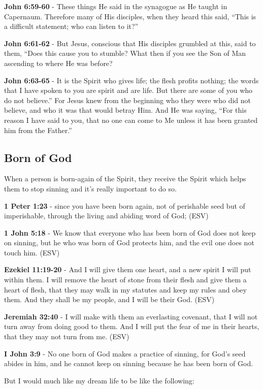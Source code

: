 \documentclass[11pt]{article}
\begin{document}
\textbf{John 6:59-60} - These things He said in the synagogue as He taught in Capernaum. Therefore many of His disciples, when they heard this said, “This is a difficult statement; who can listen to it?”

\textbf{John 6:61-62} - But Jesus, conscious that His disciples grumbled at this, said to them, “Does this cause you to stumble? What then if you see the Son of Man ascending to where He was before?

\textbf{John 6:63-65} - It is the Spirit who gives life; the flesh profits nothing; the words that I have spoken to you are spirit and are life. But there are some of you who do not believe.” For Jesus knew from the beginning who they were who did not believe, and who it was that would betray Him. And He was saying, “For this reason I have said to you, that no one can come to Me unless it has been granted him from the Father.”

\subsection{Born of God}
\label{sec:org878d47a}
When a person is born-again of the Spirit, they receive the Spirit which helps them to stop sinning and it's really important to do so.

\textbf{1 Peter 1:23} - since you have been born again, not of perishable seed but of imperishable, through the living and abiding word of God; (ESV)

\textbf{1 John 5:18} - We know that everyone who has been born of God does not keep on sinning, but he who was born of God protects him, and the evil one does not touch him. (ESV)

\textbf{Ezekiel 11:19-20} - And I will give them one heart, and a new spirit I will put within them. I will remove the heart of stone from their flesh and give them a heart of flesh, that they may walk in my statutes and keep my rules and obey them. And they shall be my people, and I will be their God. (ESV)

\textbf{Jeremiah 32:40} - I will make with them an everlasting covenant, that I will not turn away from doing good to them. And I will put the fear of me in their hearts, that they may not turn from me. (ESV)

\textbf{I John 3:9} - No one born of God makes a practice of sinning, for God's seed abides in him, and he cannot keep on sinning because he has been born of God.

But I would much like my dream life to be like the following:
\end{document}
